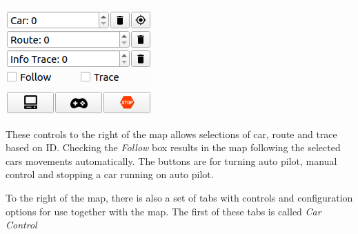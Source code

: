 \documentclass[12pt]{article} %
\begin{document}
\noindent\begin{minipage}{0.25\textwidth}
\noindent \includegraphics[width=\textwidth]{./screens/map_top_right.png}
\end{minipage}
\noindent\begin{minipage}{0.75\textwidth} These controls to the right
of the map allows selections of car, route and trace based on
ID. Checking the {\em Follow} box results in the map following the
selected cars movements automatically. The buttons are for turning
auto pilot, manual control and stopping a car running on auto pilot.
\end{minipage} 

To the right of the map, there is also a set of tabs with controls and
configuration options for use together with the map. The first of these tabs
is called {\em Car Control}
\end{document}
